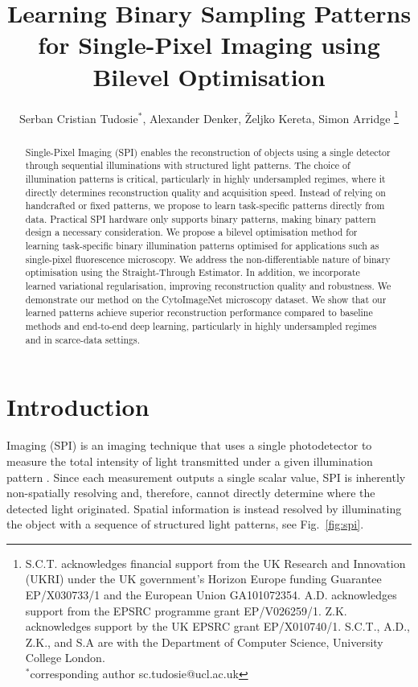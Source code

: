 \documentclass[lettersize,journal]{IEEEtran}
\begin{document}
\title{Learning Binary Sampling Patterns for Single-Pixel Imaging using Bilevel Optimisation}
\author{Serban Cristian Tudosie$^*$, Alexander Denker, \v{Z}eljko Kereta, Simon Arridge
\thanks{S.C.T. acknowledges financial support from the UK Research and Innovation (UKRI) under the UK government’s Horizon Europe funding Guarantee EP/X030733/1 and the European Union GA101072354. A.D. acknowledges support from the EPSRC programme grant EP/V026259/1. Z.K. acknowledges support by the UK EPSRC grant EP/X010740/1. S.C.T., A.D., Z.K., and S.A are with the Department of Computer Science, University College London. \\ $^*$corresponding author sc.tudosie@ucl.ac.uk}}


\maketitle
\begin{abstract}
Single-Pixel Imaging (SPI) enables the reconstruction of objects using a single detector through sequential illuminations with structured light patterns. The choice of illumination patterns is critical, particularly in highly undersampled regimes, where it directly determines reconstruction quality and acquisition speed. Instead of relying on handcrafted or fixed patterns, we propose to learn task-specific patterns directly from data. Practical SPI hardware only supports binary patterns, making binary pattern design a necessary consideration. We propose a bilevel optimisation method for learning task-specific binary illumination patterns optimised for applications such as single-pixel fluorescence microscopy. We address the non-differentiable nature of binary optimisation using the Straight-Through Estimator. In addition, we incorporate learned variational regularisation, improving reconstruction quality and robustness. We demonstrate our method on the CytoImageNet microscopy dataset. We show that our learned patterns achieve superior reconstruction performance compared to baseline methods and end-to-end deep learning, particularly in highly undersampled regimes and in scarce-data settings. 
\end{abstract}


\section{Introduction}
 Imaging (SPI) is an imaging technique that uses a single photodetector to measure the total intensity of light transmitted under a given illumination pattern \cite{Duarte_2008_SinglepixelImagingCompressive, Edgar_2019_PrinciplesProspectsSinglepixel}. 
Since each measurement outputs a single scalar value, SPI is inherently non-spatially resolving and, therefore, cannot directly determine where the detected light originated.
Spatial information is instead resolved by illuminating the object with a sequence of structured light patterns, see Fig.~\ref{fig:spi}. 
\end{document}
